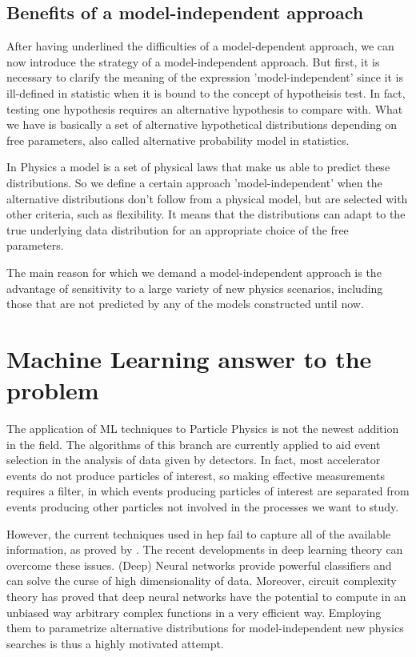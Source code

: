 \subsection{Benefits of a model-independent approach}
After having underlined the difficulties of a model-dependent approach, we can now introduce the strategy of a model-independent approach. But first, it is necessary to clarify the meaning of the expression 'model-independent' since it is ill-defined in statistic when it is bound to the concept of hypotheisis test. In fact, testing one hypothesis requires an alternative hypothesis to compare with. What we have is basically a set of alternative hypothetical distributions depending on free parameters, also called alternative probability model in statistics. 

In Physics a model is a set of physical laws that make us able to predict these distributions. So we define a certain approach 'model-independent' when the alternative distributions don't follow from a physical model, but are selected with other criteria, such as flexibility. It means that the distributions can adapt to the true underlying data distribution for an appropriate choice of the free parameters.

The main reason for which we demand a model-independent approach is the advantage of sensitivity to a large variety of new physics scenarios, including those that are not predicted by any of the models constructed until now.





\section{Machine Learning answer to the problem}
The application of ML techniques to Particle Physics is not the newest addition in the field. The algorithms of this branch are currently applied to aid event selection in the analysis of data given by detectors. In fact, most accelerator events do not produce particles of interest, so making effective measurements requires a filter, in which events producing particles of interest are separated from events producing other particles not involved in the processes we want to study.

However, the current techniques used in hep fail to capture all of the available information, as proved by \cite{baldi}. The recent developments in deep learning theory can overcome these issues. (Deep) Neural networks provide powerful classifiers and can solve the curse of high dimensionality of data. Moreover, circuit complexity theory has proved that deep neural networks have the potential to compute in an unbiased way arbitrary complex functions in a very efficient way. Employing them to parametrize alternative distributions for model-independent new physics searches is thus a highly motivated attempt.

